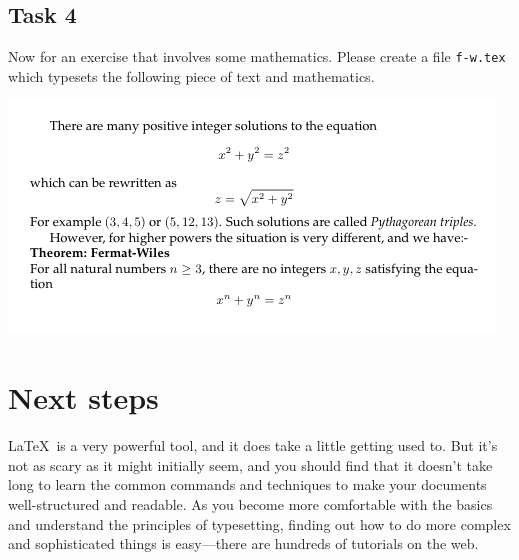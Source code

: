 \subsection{Task 4}
\label{sec:task-4}

 Now for an exercise that involves some mathematics. Please create a file \texttt{f-w.tex} which typesets the following piece of text and mathematics.
\begin{center}
  \includegraphics[width=.95\textwidth]{images/f-w.png}
\end{center}


\section{Next steps}

\LaTeX\ is a very powerful tool, and it does take a little getting used to. But it's not as scary as it might initially seem, and you should find that it doesn't take long to learn the common commands and techniques to make your documents well-structured and readable. As you become more comfortable with the basics and understand the principles of typesetting, finding out how to do more complex and sophisticated things is easy---there are hundreds of tutorials on the web. 

